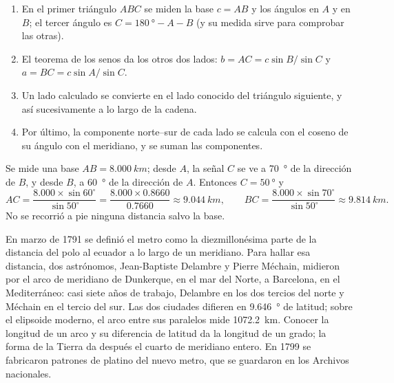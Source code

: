 \begin{method}\label{met:g10:measuring-the-earth:chain}
\begin{enumerate}
  \item En el primer triángulo $ABC$ se miden la base $c = AB$ y los
        ángulos en $A$ y en $B$; el tercer ángulo es
        $C = \qty{180}{\degree} - A - B$ (y su medida sirve para comprobar
        las otras).
  \item El teorema de los senos da los otros dos lados:
        $b = AC = c \sin B / \sin C$ y $a = BC = c \sin A / \sin C$.
  \item Un lado calculado se convierte en el lado conocido del triángulo
        siguiente, y así sucesivamente a lo largo de la cadena.
  \item Por último, la componente norte--sur de cada lado se calcula con el
        coseno de su ángulo con el meridiano, y se suman las componentes.
\end{enumerate}
\end{method}

\begin{example}[Un triángulo]\label{ex:g10:measuring-the-earth:triangle}
Se mide una base $AB = \qty{8.000}{km}$; desde $A$, la señal $C$ se ve a
\qty{70}{\degree} de la dirección de $B$, y desde $B$, a
\qty{60}{\degree} de la dirección de $A$. Entonces $C = \qty{50}{\degree}$ y
\[
  AC = \frac{8.000 \times \sin 60^\circ}{\sin 50^\circ} = \frac{8.000 \times 0.8660}{0.7660}
  \approx \qty{9.044}{km}, \qquad
  BC = \frac{8.000 \times \sin 70^\circ}{\sin 50^\circ} \approx \qty{9.814}{km}.
\]
No se recorrió a pie ninguna distancia salvo la base.
\end{example}

\begin{example}\label{ex:g10:measuring-the-earth:meridian}
En marzo de 1791 se definió el metro como la diezmillonésima parte de la
distancia del polo al ecuador a lo largo de un meridiano. Para hallar esa
distancia, dos astrónomos, Jean-Baptiste Delambre y Pierre Méchain, midieron
por  el arco de meridiano de Dunkerque, en el mar del Norte, a
Barcelona, en el Mediterráneo: casi siete años de trabajo, Delambre en los
dos tercios del norte y Méchain en el tercio del sur. Las dos ciudades
difieren en \qty{9.646}{\degree} de latitud; sobre el elipsoide moderno, el
arco entre sus paralelos mide \qty{1072.2}{km}. Conocer la longitud de un
arco y su diferencia de latitud da la longitud de un grado; la forma de la
Tierra da después el cuarto de meridiano entero. En 1799 se fabricaron
patrones de platino del nuevo metro, que se guardaron en los Archivos
nacionales.
\end{example}


